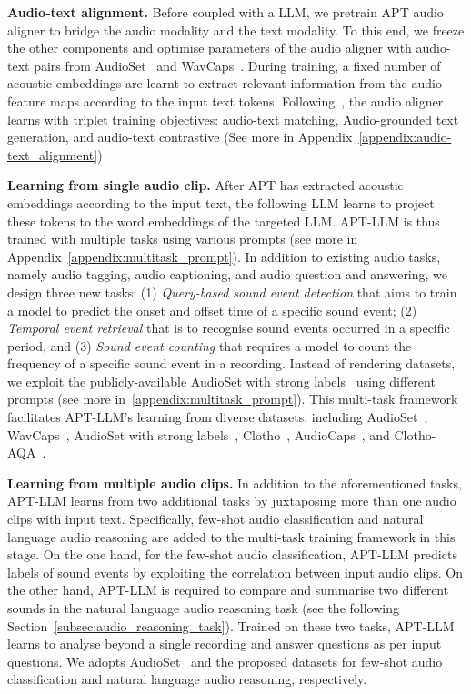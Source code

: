 \textbf{Audio-text alignment.} Before coupled with a LLM, we pretrain APT audio aligner to bridge the audio modality and the text modality. To this end, we freeze the other components and optimise parameters of the audio aligner with audio-text pairs from AudioSet~\citep{gemmeke_audio_2017} and WavCaps~\citep{mei_wavcaps_2023}. During training, a fixed number of acoustic embeddings are learnt to extract relevant information from the audio feature maps according to the input text tokens. Following~\cite{li_blip-2_2023}, the audio aligner learns with triplet training objectives: audio-text matching, Audio-grounded text generation, and audio-text contrastive (See more in Appendix~\ref{appendix:audio-text_alignment})

\textbf{Learning from single audio clip.} 
After APT has extracted acoustic embeddings according to the input text, the following LLM learns to project these tokens to the word embeddings of the targeted LLM. APT-LLM is thus trained with multiple tasks using various prompts (see more in Appendix~\ref{appendix:multitask_prompt}). In addition to existing audio tasks, namely audio tagging, audio captioning, and audio question and answering, we design three new tasks: (1) \textit{Query-based sound event detection} that aims to train a model to predict the onset and offset time of a specific sound event; (2) \textit{Temporal event retrieval} that is to recognise sound events occurred in a specific period, and (3) \textit{Sound event counting} that requires a model to count the frequency of a specific sound event in a recording. Instead of rendering datasets, we exploit the publicly-available AudioSet with strong labels~\citep{hershey_benefit_2021} using different prompts (see more in~\ref{appendix:multitask_prompt}). This multi-task framework facilitates APT-LLM's learning from diverse datasets, including AudioSet~\citep{gemmeke_audio_2017}, WavCaps~\citep{mei_wavcaps_2023}, AudioSet with strong labels~\citep{hershey_benefit_2021}, Clotho~\citep{drossos_clotho_2020}, AudioCaps~\citep{kim_audiocaps_2019}, and Clotho-AQA~\citep{lipping_clotho-aqa_2022}.

\textbf{Learning from multiple audio clips.}
In addition to the aforementioned tasks, APT-LLM learns from two additional tasks by juxtaposing more than one audio clips with input text. Specifically, few-shot audio classification and natural language audio reasoning are added to the multi-task training framework in this stage. On the one hand, for the few-shot audio classification, APT-LLM predicts labels of sound events by exploiting the correlation between input audio clips. On the other hand, APT-LLM is required to compare and summarise two different sounds in the natural language audio reasoning task (see the following Section~\ref{subsec:audio_reasoning_task}). Trained on these two tasks, APT-LLM learns to analyse beyond a single recording and answer questions as per input questions. We adopts AudioSet~\citep{gemmeke_audio_2017} and the proposed datasets for few-shot audio classification and natural language audio reasoning, respectively.


